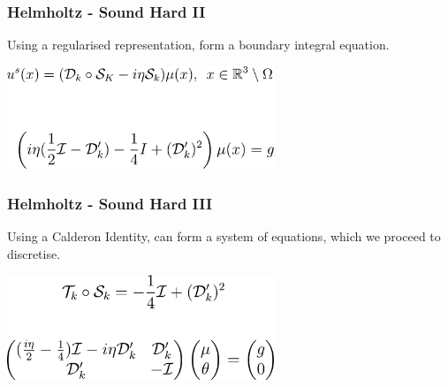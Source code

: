 \begin{frame}
    \frametitle{Helmholtz - Sound Hard II}

    Using a regularised representation, form a boundary integral equation.

    \hspace*{0.5pt}

    \centering
    \includegraphics[width=0.6\textwidth]{assets/sound_hard_2.pdf}

\end{frame}

\begin{frame}
    \frametitle{Helmholtz - Sound Hard III}

    Using a Calderon Identity, can form a system of equations, which we proceed
    to discretise.

    \hspace*{0.5pt}

    \centering

    \includegraphics[width=0.6\textwidth]{assets/sound_hard_3.pdf}
\end{frame}


